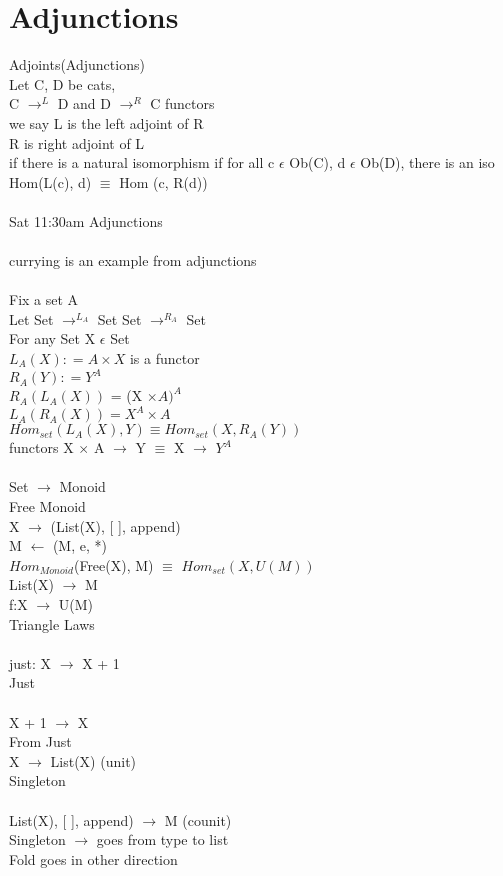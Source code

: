 \documentclass{article}
\begin{document}
\section{Adjunctions}
Adjoints(Adjunctions)
\\
Let C, D be cats, 
\\
C $\rightarrow^{L}$ D and D $\rightarrow^{R}$ C functors
\\ 
we say L is the left adjoint of R
\\
R is right adjoint of L
\\
if there is a natural isomorphism
if for all c $\epsilon$ Ob(C), d $\epsilon$ Ob(D), there is an iso
\\
Hom(L(c), d)  $\equiv$ Hom (c, R(d))
\\
\\
Sat 11:30am Adjunctions
\\
\\
currying is an example from adjunctions
\\
\\
Fix a set A
\\
Let Set $\rightarrow^{L_{A}}$ Set
Set $\rightarrow^{R_{A}}$ Set
\\
For any Set X $\epsilon$ Set
\\
$L_{A}(X): = A \times X$ is a functor
\\
$R_{A}(Y): = Y^{A}$
\\
$R_{A}(L_{A}(X))$ = (X $\times A)^{A}$
\\
$L_{A}(R_{A}(X)) = X^{A} \times A$
\\
$Hom_{set}(L_{A}(X), Y) \equiv Hom_{set} (X, R_{A}(Y))$
\\
functors X $\times$ A $\rightarrow$ Y $\equiv$ X $\rightarrow$ $Y^{A}$
\\
\\
Set $\rightarrow$ Monoid
\\
Free Monoid
\\
X $\rightarrow$ (List(X), [ ], append)
\\
M $\leftarrow$ (M, e, *)
\\
$Hom_{Monoid}$(Free(X), M) $\equiv$ $Hom_{set}(X, U(M))$
\\
List(X) $\rightarrow$ M
\\
f:X $\rightarrow$ U(M)
\\
Triangle Laws
\\
\\
just: X $\rightarrow$ X + 1 
\\
Just
\\
\\
X + 1 $\rightarrow$ X 
\\
From Just
\\
X $\rightarrow$ List(X) (unit)
\\
Singleton
\\
\\
List(X), [ ], append) $\rightarrow$ M  (counit)
\\
Singleton $\rightarrow$ goes from type to list
\\
Fold goes in other direction
\\
\\
\end{document}
